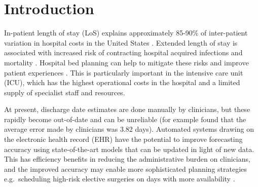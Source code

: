 \documentclass[sigconf]{acmart}
\begin{document}


\maketitle

\section{Introduction}

In-patient length of stay (LoS) explains approximately 85-90\% of inter-patient variation in hospital costs in the United States \citep{rapoport2003}. Extended length of stay is associated with increased risk of contracting hospital acquired infections \citep{hassan} and mortality \citep{LAUPLAND2006954}. Hospital bed planning can help to mitigate these risks and improve patient experiences \citep{Blom2015ThePO}. This is particularly important in the intensive care unit (ICU), which has the highest operational costs in the hospital \citep{dahl2012} and a limited supply of specialist staff and resources. 


At present, discharge date estimates are done manually by clinicians, but these rapidly become out-of-date and can be unreliable (for example \citet{Mak2012PhysiciansAT} found that the average error made by clinicians was 3.82 days). Automated systems drawing on the electronic health record (EHR) have the potential to improve forecasting accuracy using state-of-the-art models that can be updated in light of new data. This has efficiency benefits in reducing the administrative burden on clinicians, and the improved accuracy may enable more sophisticated planning strategies e.g.\ scheduling high-risk elective surgeries on days with more availability \citep{gentimis2017}.
\end{document}
